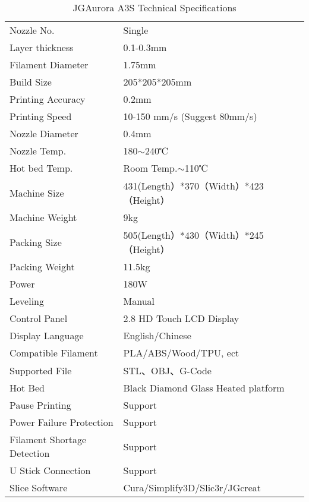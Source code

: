 \begin{table}[htbp]
    \centering
    \begin{tabular}{ll}
    Nozzle No.                  & Single                              \\
    Layer thickness             & 0.1-0.3mm                           \\
    Filament Diameter           & 1.75mm                              \\
    Build Size                  & 205*205*205mm                       \\
    Printing Accuracy           & 0.2mm                               \\
    Printing Speed              & 10-150 mm/s (Suggest 80mm/s)        \\
    Nozzle Diameter             & 0.4mm                               \\
    Nozzle Temp.                & 180$\sim$240℃                       \\
    Hot bed Temp.               & Room Temp.$\sim$110℃                \\
    Machine Size                & 431(Length）*370（Width）*423（Height）  \\
    Machine Weight              & 9kg                                 \\
    Packing Size                & 505(Length）*430（Width）*245（Height）  \\
    Packing Weight              & 11.5kg                              \\
    Power                       & 180W                                \\
    Leveling                    & Manual                              \\
    Control Panel               & 2.8 HD Touch LCD Display            \\
    Display Language            & English/Chinese                     \\
    Compatible Filament         & PLA/ABS/Wood/TPU, ect               \\
    Supported File              & STL、OBJ、G-Code                      \\
    Hot Bed                     & Black Diamond Glass Heated platform \\
    Pause Printing              & Support                             \\
    Power Failure Protection    & Support                             \\
    Filament Shortage Detection & Support                             \\
    U Stick Connection          & Support                             \\
    Slice Software              & Cura/Simplify3D/Slic3r/JGcreat     
    \end{tabular}
    \caption{JGAurora A3S Technical Specifications}
    \label{tab:A3S}
\end{table}

